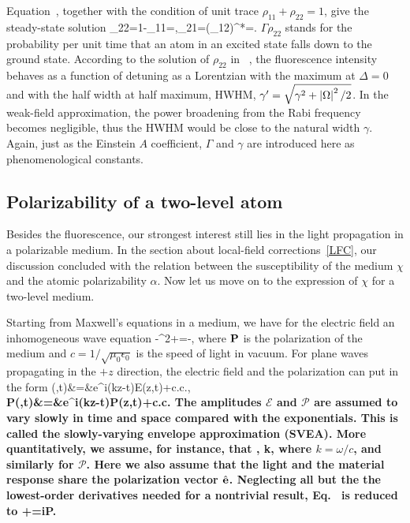 Equation~, together with the condition of unit trace $\rho_{11}+\rho_{22}=1$, give the steady-state solution
\bea
\rho_{22}=1-\rho_{11}=,\quad\rho_{21}=(\rho_{12})^*=.
\label{STEADY_STATE}
\eea
$\Gamma\rho_{22}$ stands for the probability per unit time that an atom in an excited state falls down to the ground state. According to the solution of $\rho_{22}$ in ~, the fluorescence intensity behaves as a function of detuning as a Lorentzian with the maximum at $\Delta=0$ and with the half width at half maximum, HWHM, $\gamma^\prime=\sqrt{\gamma^2+\left| \Omega \right|^2/2}$.  In the weak-field approximation, the power broadening from the Rabi frequency becomes negligible, thus the HWHM would be close to the natural width $\gamma$. Again, just as the Einstein $A$ coefficient, $\Gamma$  and $\gamma$ are introduced here as phenomenological constants.

\subsection{Polarizability of a two-level atom}
Besides the fluorescence, our strongest interest still lies in the light propagation in a polarizable medium. In the section about local-field corrections~\ref{LFC}, our discussion concluded with the relation between the susceptibility of the medium $\chi$ and the atomic polarizability $\alpha$. Now let us move on to the expression of $\chi$ for a two-level medium.

Starting from Maxwell's equations in a medium, we have for the electric field an inhomogeneous wave equation
\bea
-\nabla^2\bE+=-,
\label{WAVE_EQ}
\eea
where $\bf P$ is the polarization of the medium and $c=1/\sqrt{\mu_0\epsilon_0}$ is the speed of light in vacuum. For plane waves propagating in the $+z$ direction, the electric field and the polarization can put in the form
\bea
\bE(\br,t)&=&e^{i(kz-\omega t)}\mathcal E(z,t)+{\rm c.c}.,\\
\bf P(\br,t)&=&e^{i(kz-\omega t)}\mathcal P(z,t)+{\rm c.c.}
\eea
The amplitudes $\mathcal E$ and $\mathcal P$ are assumed to vary slowly in time and space compared with the exponentials. This is called the slowly-varying envelope approximation (SVEA). More quantitatively, we assume, for  instance, that
\bea
{}\ll \omega{}, \quad {}\ll k, 
\eea
where $k=\omega/c$, and similarly for $\mathcal P$. Here we also assume that the light and the material response share the polarization vector $\hat{\bf e}$. Neglecting all but the the lowest-order derivatives needed for a nontrivial result, Eq.~ is reduced to 
\bea
{}+=i\mathcal P.
\label{BASIC_EQ}
\eea

